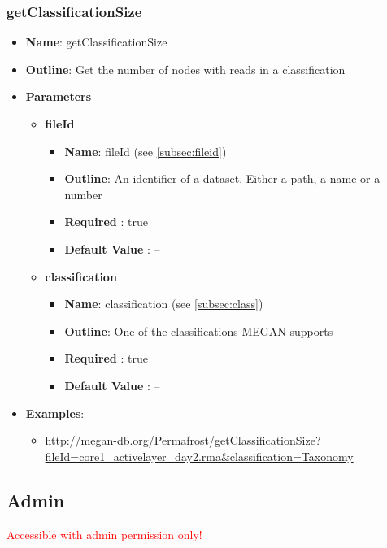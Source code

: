 \documentclass[11pt]{article}
\begin{document}
\subsubsection{getClassificationSize}
\begin{itemize}
	\item \textbf{Name}: getClassificationSize
	\item \textbf{Outline}: Get the number of nodes with reads in a classification
	\item \textbf{Parameters}
		\begin{itemize}
			\item \textbf{fileId}		
				\begin{itemize}
					\item \textbf{Name}: fileId (see \ref{subsec:fileid})
					\item \textbf{Outline}: An identifier of a dataset. Either a path, a name or a number
					\item \textbf{Required} : true
					\item \textbf{Default Value} : --
				\end{itemize}
			\item \textbf{classification}		
				\begin{itemize}
					\item \textbf{Name}: classification (see \ref{subsec:class})
					\item \textbf{Outline}: One of the classifications MEGAN supports
					\item \textbf{Required} : true
					\item \textbf{Default Value} : --
				\end{itemize}
		\end{itemize}
	\item \textbf{Examples}:
		\begin{itemize}		
			\item \url{http://megan-db.org/Permafrost/getClassificationSize?fileId=core1_activelayer_day2.rma&classification=Taxonomy}
		\end{itemize}
\end{itemize}

\subsection{Admin}
\textcolor{red}{Accessible with admin permission only!}
\end{document}
